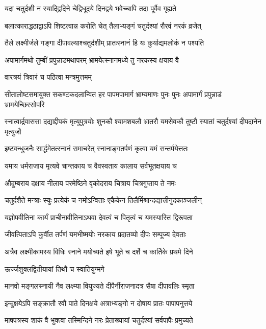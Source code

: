 \twolineshloka
{यदा चतुर्दशी न स्याद्द्विदिने चेद्विधूदये}
{दिनद्वये भवेच्चापि तदा पूर्वैव गृह्यते} %

\twolineshloka
{बलात्काराद्धठाद्वाऽपि शिष्टत्वान्न करोति चेत्}
{तैलाभ्यङ्गं चतुर्दश्यां रौरवं नरकं व्रजेत्} %

\twolineshloka
{तैले लक्ष्मीर्जले गङ्गा दीपावल्याश्चतुर्दशीम्}
{प्रातःस्नानं हि यः कुर्याद्यमलोकं न पश्यति} %

\twolineshloka
{अपामार्गमथो तुम्बीं प्रपुन्नाडमथापरम्}
{भ्रामयेत्स्नानमध्ये तु नरकस्य क्षयाय वै} %


\onelineshloka
{वारत्रयं त्रिवारं च पठित्वा मन्त्रमुत्तमम्} %

\threelineshloka
{सीतालोष्टसमायुक्त सकण्टकदलान्वित}
{हर पापमपामार्ग भ्राम्यमाणः पुनः पुनः}
{अपामार्गं प्रपुन्नाडं भ्रामयेच्छिरसोपरि} %

\threelineshloka
{स्नात्वार्द्रवाससा दद्याद्दीपकं मृत्युपुत्रयोः}
{शुनकौ श्यामशबलौ भ्रातरौ यमसेवकौ}
{तुष्टौ स्यातां चतुर्दश्यां दीपदानेन मृत्युजौ} %

\twolineshloka
{इष्टवन्धुजनैः सार्द्धमेतत्स्नानं समाचरेत्}
{स्नानाङ्गतर्पणं कृत्वा यमं सन्तर्पयेत्ततः} %

\twolineshloka
{यमाय धर्मराजाय मृत्यवे चान्तकाय च}
{वैवस्वताय कालाय सर्वभूतक्षयाय च} %

\twolineshloka
{औदुम्बराय दक्षाय नीलाय परमेष्ठिने}
{वृकोदराय चित्राय चित्रगुप्ताय ते नमः} %

\twolineshloka
{चतुर्दशैते मन्त्राः स्युः प्रत्येकं च नमोऽन्विताः}
{एकैकेन तिलैर्मिश्रान्दद्यात्त्रीनुदकाञ्जलीन्} %

\twolineshloka
{यज्ञोपवीतिना कार्यं प्राचीनावीतिनाऽथवा}
{देवत्वं च पितृत्वं च यमस्यास्ति द्विरूपता} %

\twolineshloka
{जीवत्पिताऽपि कुर्वीत तर्पणं यमभीष्मयोः}
{नरकाय प्रदातव्यो दीपः सम्पूज्य देवताः} %

\twolineshloka
{अत्रैव लक्ष्मीकामस्य विधिः स्नाने मयोच्यते}
{इषे भूते च दर्शे च कार्तिके प्रथमे दिने} %



\onelineshloka
{ऊर्ज्जशुक्लद्वितीयायां तिथौ च स्वातियुग्मगे} %

\twolineshloka
{मानवो मङ्गलस्नायी नैव लक्ष्म्या वियुज्यते}
{दीपैर्नीराजनादत्र सैषा दीपावलिः स्मृता} %

\twolineshloka
{इन्दुक्षयेऽपि सङ्क्रातौ रवौ पाते दिनक्षये}
{अत्राभ्यङ्गो न दोषाय प्रातः पापापनुत्तये} %

\twolineshloka
{माषपत्रस्य शाकं वै भुक्त्वा तस्मिन्दिने नरः}
{प्रेताख्यायां चतुर्दश्यां सर्वपापैः प्रमुच्यते} %

